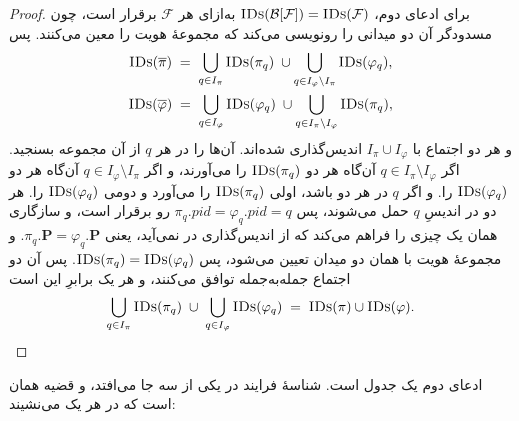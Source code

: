 \documentclass[10pt,oneside,openany]{book}
\newcommand{\Ps}{\mathbf{P}}
\newcommand{\PID}{\mathit{pid}}
\newcommand{\Blk}{\mathcal{B}}
\newcommand{\F}{\mathcal{F}}
\newcommand{\op}[1]{\textnormal{\textsc{#1}}}
\newcommand{\IDs}{\op{IDs}}
\theoremstyle{accentdef}
\theoremstyle{accentplain}
\begin{document}
\begin{proof}
برای ادعای دوم، $\IDs(\Blk[\F]) = \IDs(\F)$ به‌ازای هر $\F$ برقرار است،
چون مسدودگر آن دو میدانی را رونویسی می‌کند که مجموعهٔ هویت را معین
می‌کنند. پس
\[
  \begin{gathered}
  \IDs(\overline{\pi}) \;=\; \bigcup_{q \in I_\pi} \IDs(\pi_q) \;\cup \bigcup_{q \in I_\varphi \setminus I_\pi} \IDs(\varphi_q), \\
  \IDs(\overline{\varphi}) \;=\; \bigcup_{q \in I_\varphi} \IDs(\varphi_q) \;\cup \bigcup_{q \in I_\pi \setminus I_\varphi} \IDs(\pi_q),
  \end{gathered}
\]
و هر دو اجتماع با $I_\pi \cup I_\varphi$ اندیس‌گذاری شده‌اند. آن‌ها را در
هر $q$ از آن مجموعه بسنجید. اگر $q \in I_\pi \setminus I_\varphi$ آن‌گاه هر
دو $\IDs(\pi_q)$ را می‌آورند، و اگر $q \in I_\varphi \setminus I_\pi$
آن‌گاه هر دو $\IDs(\varphi_q)$ را. و اگر $q$ در هر دو باشد، اولی
$\IDs(\pi_q)$ را می‌آورد و دومی $\IDs(\varphi_q)$ را. هر دو در اندیسِ $q$
حمل می‌شوند، پس $\pi_q.\PID = \varphi_q.\PID = q$ رو برقرار است، و
سازگاری همان یک چیزی را فراهم می‌کند که از اندیس‌گذاری در نمی‌آید، یعنی
$\pi_q.\Ps = \varphi_q.\Ps$. و مجموعهٔ هویت با همان دو میدان تعیین می‌شود،
پس $\IDs(\pi_q) = \IDs(\varphi_q)$. پس آن دو اجتماع جمله‌به‌جمله توافق
می‌کنند، و هر یک برابرِ این است
\[
  \bigcup_{q \in I_\pi} \IDs(\pi_q) \;\cup\; \bigcup_{q \in I_\varphi} \IDs(\varphi_q)
  \;=\; \IDs(\pi) \cup \IDs(\varphi) .
\]
\end{proof}

ادعای دوم یک جدول است. شناسهٔ فرایند در یکی از سه جا می‌افتد، و قضیه همان
است که در هر یک می‌نشیند:
\end{document}
